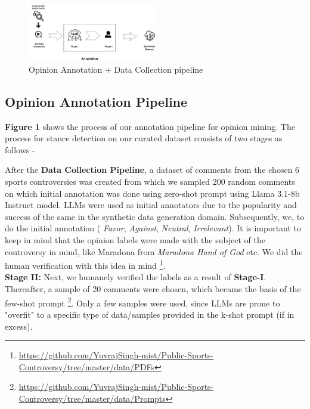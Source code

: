 \documentclass[sigconf, review]{acmart}
\begin{document}
\begin{figure}[h]
    \centering
        \centering
        \includegraphics[width=0.5\textwidth]{SportsOpi.jpg} %
        \caption{Opinion Annotation  + Data Collection pipeline}
        \label{fig:labels}
 \end{figure}




\subsection{Opinion Annotation Pipeline}

\textbf{Figure 1} shows the process of our annotation pipeline for opinion mining.
The process for stance detection on our curated dataset consists of two stages as follows - 

 After the \textbf{Data Collection Pipeline}, a dataset of comments from the chosen 6 sports controversies was created from which we sampled 200 random comments on which initial annotation was done using zero-shot prompt using Llama 3.1-8b Instruct model. 
LLMs were used as initial annotators \cite{tan2024largelanguagemodelsdata, pavlovic-poesio-2024-effectiveness} due to the popularity and success of the same in the synthetic data generation domain. 
Subsequently, we, to do the initial annotation ( \textit{Favor}, \textit{Against}, \textit{Neutral}, \textit{Irrelevant}).
It is important to keep in mind that the opinion labels were made with the subject of the controversy in mind, like Maradona from \textit{Maradona Hand of God} etc. We did the human verification with this idea in mind \footnote{\url{https://github.com/YuvrajSingh-mist/Public-Sports-Controversy/tree/master/data/PDFs}}. \\
{\bf Stage II:} Next, we humanely verified the labels as a result of {\bf Stage-I}. Thereafter, a sample of 20 comments were chosen, which became the basis of the few-shot prompt \footnote{\url{https://github.com/YuvrajSingh-mist/Public-Sports-Controversy/tree/master/data/Prompts}}. Only a few samples were used, since LLMs are prone to "overfit" to a specific type of data/samples provided in the k-shot prompt (if in excess).
\end{document}
